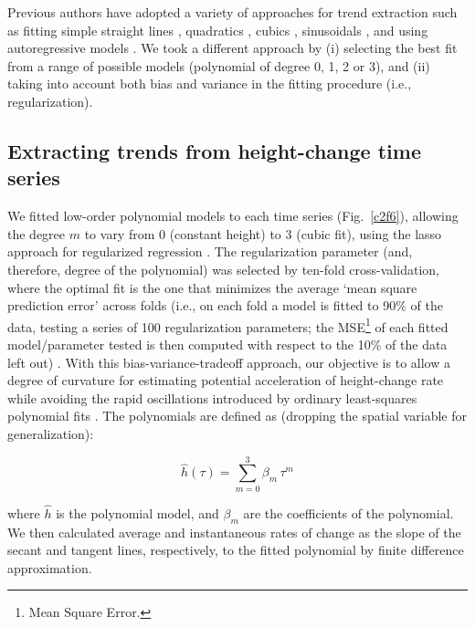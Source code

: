 Previous authors have adopted a variety of approaches for trend extraction such as fitting simple straight lines \parencite{Pritchard2012, Shepherd2010}, quadratics \parencite{Wingham2009}, cubics \parencite{Schenk2012}, sinusoidals \parencite{Zwally2005}, and using autoregressive models \parencite{Davis2005}. We took a different approach by (i) selecting the best fit from a range of possible models (polynomial of degree 0, 1, 2 or 3), and (ii) taking into account both bias and variance in the fitting procedure (i.e., regularization).

\subsection{Extracting trends from height-change time series}

\noindent
We fitted low-order polynomial models to each time series (Fig.~\ref{c2f6}), allowing the degree $m$ to vary from 0 (constant height) to 3 (cubic fit), using the lasso approach for regularized regression \parencite{Tibshirani1996}. The regularization parameter (and, therefore, degree of the polynomial) was selected by ten-fold cross-validation, where the optimal fit is the one that minimizes the average `mean square prediction error' across folds (i.e., on each fold a model is fitted to 90\% of the data, testing a series of 100 regularization parameters; the MSE\footnote{Mean Square Error.} of each fitted model/parameter tested is then computed with respect to the 10\% of the data left out) \parencite{Friedman2010}. With this bias-variance-tradeoff approach, our objective is to allow a degree of curvature for estimating potential acceleration of height-change rate while avoiding the rapid oscillations introduced by ordinary least-squares polynomial fits \parencite{Paolo2015}. The polynomials are defined as (dropping the spatial variable for generalization):

\begin{equation}
  \hat h(\tau) = \sum_{m=0}^3 \beta_m \, \tau^m
  \label{c2e5}
\end{equation}

\noindent
where $\hat h$ is the polynomial model, and $\beta_m$ are the coefficients of the polynomial. We then calculated average and instantaneous rates of change as the slope of the secant and tangent lines, respectively, to the fitted polynomial by finite difference approximation. 


